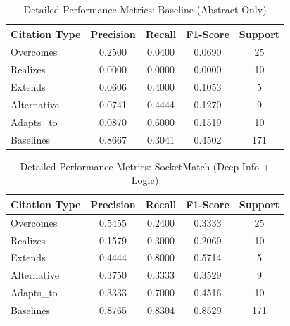 \begin{table}[htbp]
\centering
\caption{Detailed Performance Metrics: Baseline (Abstract Only)}
\label{tab:detailed_metrics_1}
\begin{tabular}{lcccc}
\toprule
\textbf{Citation Type} & \textbf{Precision} & \textbf{Recall} & \textbf{F1-Score} & \textbf{Support} \\
\midrule
Overcomes & 0.2500 & 0.0400 & 0.0690 & 25 \\
Realizes & 0.0000 & 0.0000 & 0.0000 & 10 \\
Extends & 0.0606 & 0.4000 & 0.1053 & 5 \\
Alternative & 0.0741 & 0.4444 & 0.1270 & 9 \\
Adapts_to & 0.0870 & 0.6000 & 0.1519 & 10 \\
Baselines & 0.8667 & 0.3041 & 0.4502 & 171 \\
\bottomrule
\end{tabular}
\end{table}

\begin{table}[htbp]
\centering
\caption{Detailed Performance Metrics: SocketMatch (Deep Info + Logic)}
\label{tab:detailed_metrics_2}
\begin{tabular}{lcccc}
\toprule
\textbf{Citation Type} & \textbf{Precision} & \textbf{Recall} & \textbf{F1-Score} & \textbf{Support} \\
\midrule
Overcomes & 0.5455 & 0.2400 & 0.3333 & 25 \\
Realizes & 0.1579 & 0.3000 & 0.2069 & 10 \\
Extends & 0.4444 & 0.8000 & 0.5714 & 5 \\
Alternative & 0.3750 & 0.3333 & 0.3529 & 9 \\
Adapts_to & 0.3333 & 0.7000 & 0.4516 & 10 \\
Baselines & 0.8765 & 0.8304 & 0.8529 & 171 \\
\bottomrule
\end{tabular}
\end{table}
